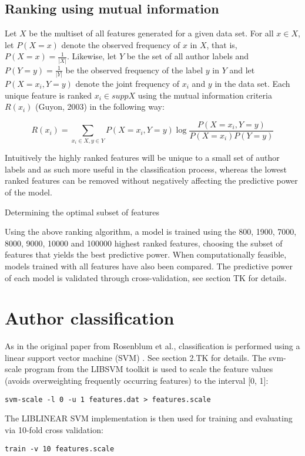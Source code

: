 \documentclass[a4paper,11pt]{kth-mag}
\begin{document}
\subsection{Ranking using mutual information}
Let $X$ be the multiset of all features generated for a given data set. For all
$x \in X$, let $P(X = x)$ denote the observed frequency of $x$ in $X$, that is,
$P(X = x) = \frac{1}{|X|}$. Likewise, let $Y$ be the set of all author labels
and $P(Y = y)= \frac{1}{|Y|}$ be the observed frequency of the label $y$ in $Y$
and let $P(X=x_i,Y=y)$ denote the joint frequency of $x_i$ and $y$ in the data
set. Each unique feature is ranked $x_i \in supp X $ using the mutual information
criteria $R(x_i)$ (Guyon, 2003) in the following way:

$$R(x_i)= \sum_{x_i \in X, y \in Y} P(X=x_i,Y=y) \log \frac{P(X = x_i,
Y = y)}{P(X = x_i)P(Y = y)}$$

Intuitively the highly ranked features will be unique to a small set of author
labels and as such more useful in the classification process, whereas the
lowest ranked features can be removed without negatively affecting the
predictive power of the model.
 
Determining the optimal subset of features
 
Using the above ranking algorithm, a model is trained using the 800, 1900, 7000,
8000, 9000, 10000 and 100000 highest ranked features, choosing the subset of
features that yields the best predictive power. When computationally feasible, models
trained with all features have also been compared.
The predictive power of each model is validated through cross-validation, see
section TK for details.

\section{Author classification}
As in the original paper from Rosenblum et al., classification is performed
using a linear support vector machine (SVM) \parencite{rosenblum2011wrote}. See
section 2.TK for details. The svm-scale program from the LIBSVM toolkit is used
\parencite{chang2011libsvm} to scale the feature values (avoids overweighting
frequently occurring features) to the interval [0, 1]:
\begin{lstlisting}
svm-scale -l 0 -u 1 features.dat > features.scale
\end{lstlisting}

The LIBLINEAR SVM implementation is then used \parencite{fan2008liblinear} for
training and evaluating via 10-fold cross validation:
\begin{lstlisting}
train -v 10 features.scale
\end{lstlisting}
\end{document}
